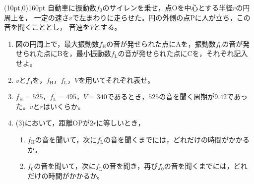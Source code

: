 \hakosyokika
\item
    \begin{mawarikomi}(10pt,0){160pt}{}
    自動車に振動数$f_0$のサイレンを乗せ，点Oを中心とする半径$r$の円周上を，
    一定の速さ$v$で左まわりに走らせた。円の外側の点Pに人が立ち，この音を聞くこととし，
    音速を$V$とする。
        \begin{enumerate}
            \item 図の円周上で，最大振動数$f_\mathrm{H}$の音が発せられた点にAを，振動数$f_0$の音が発せられた点にBを，最小振動数$f_\mathrm{L}$の音が発せられた点にCを，それぞれ記入せよ。
            \item $v$と$f_0$を，$f_\mathrm{H}$，$f_\mathrm{L}$，$V$を用いてそれぞれ表せ。
            \item $f_\mathrm{H}=525$，$f_\mathrm{L}=495$，$V=340$であるとき，$525$の音を聞く周期が$9.42$であった。$v$と$r$はいくらか。
            \item (3)において，距離OPが$2r$に等しいとき，
                \begin{enumerate}
                    \item $f_\mathrm{H}$の音を聞いて，次に$f_\mathrm{L}$の音を聞くまでには，どれだけの時間がかかるか。
                    \item $f_0$の音を聞いて，次に$f_\mathrm{L}$の音を聞き，再び$f_0$の音を聞くまでには，どれだけの時間がかかるか。
                \end{enumerate}
        \end{enumerate}
    \end{mawarikomi}